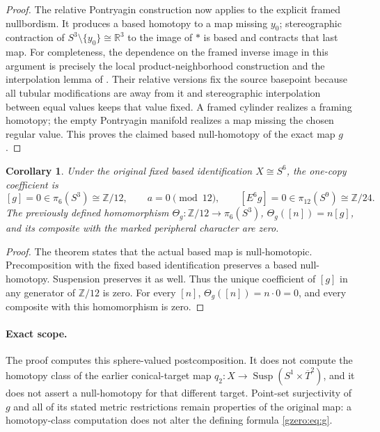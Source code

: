 \documentclass[11pt]{article}
\newtheorem{corollary}[theorem]{Corollary}
\theoremstyle{definition}
\newcommand{\R}{\mathbb R}
\newcommand{\Z}{\mathbb Z}
\begin{document}
\begin{proof}
The relative Pontryagin construction now applies to the explicit
framed nullbordism. It produces a based homotopy to a map missing
\(y_0\); stereographic contraction of \(S^3\setminus\{y_0\}\cong\R^3\)
to the image of \(*\) is based and contracts that last map.
For completeness, the dependence on the framed inverse image in this
argument is precisely the local product-neighborhood construction and
the interpolation lemma of \cite[\S7, Theorem B and Lemma 4,
pp.~43, 48--50]{Milnor1965}. Their relative versions fix the source
basepoint because all tubular modifications are away from it and
stereographic interpolation between equal values keeps that value
fixed. A framed cylinder realizes a framing homotopy; the empty
Pontryagin manifold realizes a map missing the chosen regular value.
This proves the claimed based null-homotopy of the exact map \(g\).
\end{proof}

\begin{corollary}
Under the original fixed based identification \(X\cong S^6\), the
one-copy coefficient is
\[
 [g]=0\in\pi_6(S^3)\cong\Z/12,\qquad a=0\pmod{12},\qquad
 [E^6g]=0\in\pi_{12}(S^9)\cong\Z/24.
\]
The previously defined homomorphism
\(\Theta_g:\Z/12\to\pi_6(S^3)\), \(\Theta_g([n])=n[g]\), and
its composite with the marked peripheral character are zero.
\end{corollary}
\begin{proof}
The theorem states that the actual based map is null-homotopic.
Precomposition with the fixed based identification preserves a based
null-homotopy. Suspension preserves it as well. Thus the unique
coefficient of \([g]\) in any generator of \(\Z/12\) is zero.
For every \([n]\), \(\Theta_g([n])=n\cdot0=0\), and every
composite with this homomorphism is zero.
\end{proof}

\paragraph{Exact scope.}
The proof computes this sphere-valued postcomposition. It does not
compute the homotopy class of the earlier conical-target map
\(q_2:X\to\operatorname{Susp}(S^1\times\overline T^2)\), and it
does not assert a null-homotopy for that different target. Point-set
surjectivity of \(g\) and all of its stated metric restrictions remain
properties of the original map: a homotopy-class computation does not
alter the defining formula \eqref{gzero:eq:g}.

\end{document}
